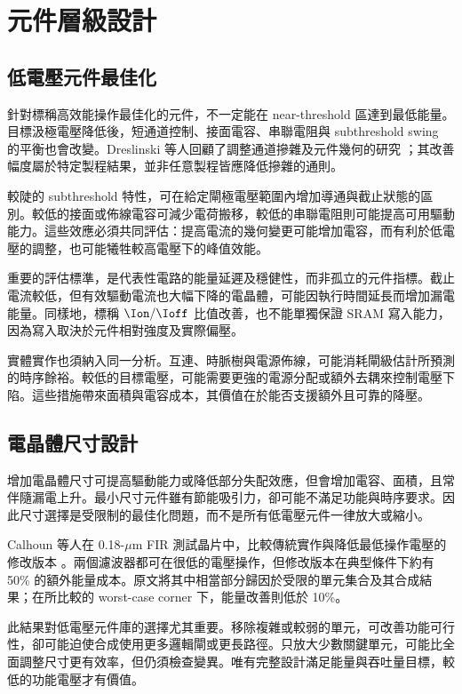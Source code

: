 \chapter{元件層級設計}
\label{ch:device}
\section{低電壓元件最佳化}
針對標稱高效能操作最佳化的元件，不一定能在 near-threshold 區達到最低能量。目標汲極電壓降低後，短通道控制、接面電容、串聯電阻與 subthreshold swing 的平衡也會改變。Dreslinski 等人回顧了調整通道摻雜及元件幾何的研究 \cite[Sec.~V-A]{dreslinski2010}；其改善幅度屬於特定製程結果，並非任意製程皆應降低摻雜的通則。

較陡的 subthreshold 特性，可在給定閘極電壓範圍內增加導通與截止狀態的區別。較低的接面或佈線電容可減少電荷搬移，較低的串聯電阻則可能提高可用驅動能力。這些效應必須共同評估：提高電流的幾何變更可能增加電容，而有利於低電壓的調整，也可能犧牲較高電壓下的峰值效能。

重要的評估標準，是代表性電路的能量延遲及穩健性，而非孤立的元件指標。截止電流較低，但有效驅動電流也大幅下降的電晶體，可能因執行時間延長而增加漏電能量。同樣地，標稱 $\Ion/\Ioff$ 比值改善，也不能單獨保證 SRAM 寫入能力，因為寫入取決於元件相對強度及實際偏壓。

實體實作也須納入同一分析。互連、時脈樹與電源佈線，可能消耗閘級估計所預測的時序餘裕。較低的目標電壓，可能需要更強的電源分配或額外去耦來控制電壓下陷。這些措施帶來面積與電容成本，其價值在於能否支援額外且可靠的降壓。

\section{電晶體尺寸設計}
增加電晶體尺寸可提高驅動能力或降低部分失配效應，但會增加電容、面積，且常伴隨漏電上升。最小尺寸元件雖有節能吸引力，卻可能不滿足功能與時序要求。因此尺寸選擇是受限制的最佳化問題，而不是所有低電壓元件一律放大或縮小。

Calhoun 等人在 0.18-$\mu$m FIR 測試晶片中，比較傳統實作與降低最低操作電壓的修改版本 \cite{calhoun2005}。兩個濾波器都可在很低的電壓操作，但修改版本在典型條件下約有 50\% 的額外能量成本。原文將其中相當部分歸因於受限的單元集合及其合成結果；在所比較的 worst-case corner 下，能量改善則低於 10\%。

此結果對低電壓元件庫的選擇尤其重要。移除複雜或較弱的單元，可改善功能可行性，卻可能迫使合成使用更多邏輯閘或更長路徑。只放大少數關鍵單元，可能比全面調整尺寸更有效率，但仍須檢查變異。唯有完整設計滿足能量與吞吐量目標，較低的功能電壓才有價值。

